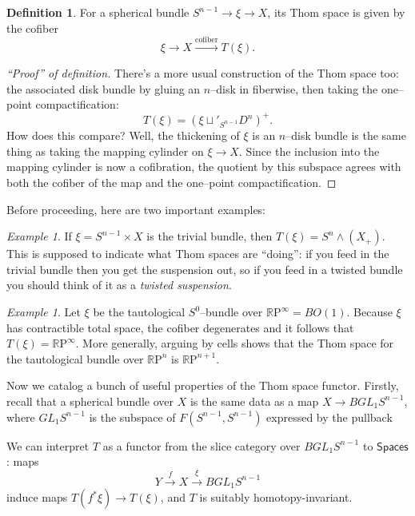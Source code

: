 \documentclass{article}
\newcommand{\R}{\mathbb R}
\newcommand{\RP}{\R\mathrm P}
\newcommand{\<}{\langle}
\renewcommand{\>}{\rangle}
\newcommand{\sm}{\wedge}
\newcommand{\CatOf}[1]{\mathsf{#1}}
\newcommand{\GL}{\mathit{GL}}
\DeclareMathOperator{\End}{End}
\DeclareMathOperator{\Aut}{Aut}
\numberwithin{equation}{section}
\theoremstyle{plain}
\theoremstyle{definition}
\newtheorem{definition}[equation]{Definition}
\theoremstyle{remark}
\newtheorem{example}[equation]{Example}
\begin{document}
\begin{definition}
For a spherical bundle $S^{n-1} \to \xi \to X$, its Thom space is given by the cofiber \[\xi \to X \xrightarrow{\text{cofiber}} T(\xi).\]
\end{definition}
\begin{proof}[``Proof'' of definition]
There's a more usual construction of the Thom space too: the associated disk bundle by gluing an $n$--disk in fiberwise, then taking the one--point compactification: \[T(\xi) = (\xi \sqcup'_{S^{n-1}} D^n)^+.\] How does this compare? Well, the thickening of $\xi$ is an $n$--disk bundle is the same thing as taking the mapping cylinder on $\xi \to X$. Since the inclusion into the mapping cylinder is now a cofibration, the quotient by this subspace agrees with both the cofiber of the map and the one--point compactification.
\end{proof}

Before proceeding, here are two important examples:
\begin{example}\label{TrivialBundleThomExample}
If $\xi = S^{n-1} \times X$ is the trivial bundle, then $T(\xi) = S^n \sm (X_+)$.  This is supposed to indicate what Thom spaces are ``doing'': if you feed in the trivial bundle then you get the suspension out, so if you feed in a twisted bundle you should think of it as a \textit{twisted suspension}.
\end{example}

\begin{example}\label{RPnThomExample}
Let $\xi$ be the tautological $S^0$--bundle over $\RP^\infty = BO(1)$.  Because $\xi$ has contractible total space, the cofiber degenerates and it follows that $T(\xi) = \RP^\infty$. More generally, arguing by cells shows that the Thom space for the tautological bundle over $\RP^n$ is $\RP^{n+1}$.
\end{example}

Now we catalog a bunch of useful properties of the Thom space functor. Firstly, recall that a spherical bundle over $X$ is the same data as a map $X \to B \GL_1 S^{n-1}$, where $\GL_1 S^{n-1}$ is the subspace of $F(S^{n-1}, S^{n-1})$ expressed by the pullback
\begin{center}
\end{center}
We can interpret $T$ as a functor from the slice category over $BGL_1 S^{n-1}$ to $\CatOf{Spaces}$: maps \[Y \xrightarrow{f} X \xrightarrow{\xi} B \GL_1 S^{n-1}\] induce maps $T(f^* \xi) \to T(\xi)$, and $T$ is suitably homotopy-invariant.
\end{document}
